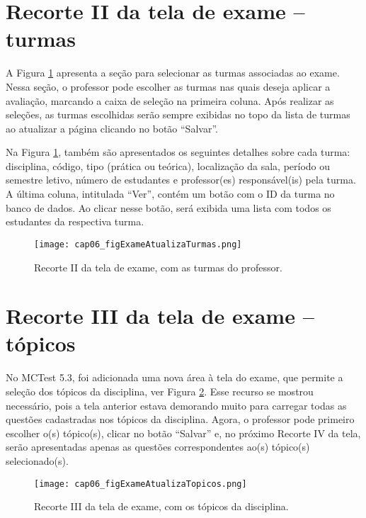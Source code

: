 \section{Recorte II da tela de exame -- turmas}\label{sec:exameTurmas}

A Figura \ref{fig:cap06_figExameAtualizaTurmas} apresenta a seção para selecionar as turmas associadas ao exame. Nessa seção, o professor pode escolher as turmas nas quais deseja aplicar a avaliação, marcando a caixa de seleção na primeira coluna. Após realizar as seleções, as turmas escolhidas serão sempre exibidas no topo da lista de turmas ao atualizar a página clicando no botão ``Salvar''. 

Na Figura \ref{fig:cap06_figExameAtualizaTurmas}, também são apresentados os seguintes detalhes sobre cada turma: disciplina, código, tipo (prática ou teórica), localização da sala, período ou semestre letivo, número de estudantes e professor(es) responsável(is) pela turma. A última coluna, intitulada ``Ver'', contém um botão com o ID da turma no banco de dados. Ao clicar nesse botão, será exibida uma lista com todos os estudantes da respectiva turma.

\begin{figure}[htbp]
  \centering
  \texttt{[image: cap06\_figExameAtualizaTurmas.png]}
  \caption{Recorte II da tela de exame, com as turmas do professor.}
  \label{fig:cap06_figExameAtualizaTurmas}\vspace{-3mm}
\end{figure}

\section{Recorte III da tela de exame -- tópicos}\label{sec:exameTopicos}

No MCTest 5.3, foi adicionada uma nova área à tela do exame, que permite a seleção dos tópicos da disciplina, ver Figura \ref{fig:cap06_figExameAtualizaTopicos}. Esse recurso se mostrou necessário, pois a tela anterior estava demorando muito para carregar todas as questões cadastradas nos tópicos da disciplina. Agora, o professor pode primeiro escolher o(s) tópico(s), clicar no botão ``Salvar'' e, no próximo Recorte IV da tela, serão apresentadas apenas as questões correspondentes ao(s) tópico(s) selecionado(s).

\begin{figure}[htbp]
  \centering
  \texttt{[image: cap06\_figExameAtualizaTopicos.png]}
  \caption{Recorte III da tela de exame, com os tópicos da disciplina.}
  \label{fig:cap06_figExameAtualizaTopicos}\vspace{-3mm}
\end{figure}

